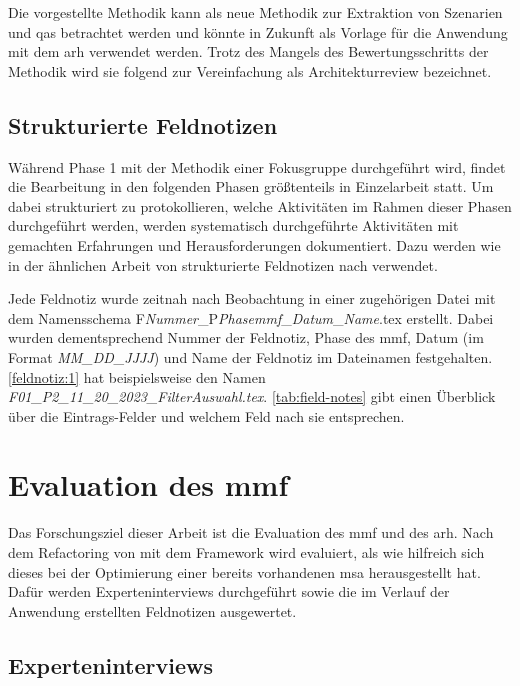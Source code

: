 Die vorgestellte Methodik kann als neue Methodik zur Extraktion von Szenarien und \glspl{qa} betrachtet werden und könnte in Zukunft als Vorlage für die Anwendung mit dem \gls{arh} verwendet werden.
Trotz des Mangels des Bewertungsschritts der Methodik wird sie folgend zur Vereinfachung als Architekturreview bezeichnet.

\subsection{Strukturierte Feldnotizen}
\label{sec:structured-field-notes}
Während Phase 1 mit der Methodik einer Fokusgruppe durchgeführt wird, findet die Bearbeitung in den folgenden Phasen größtenteils in Einzelarbeit statt.
Um dabei strukturiert zu protokollieren, welche Aktivitäten im Rahmen dieser Phasen durchgeführt werden, werden systematisch durchgeführte Aktivitäten mit gemachten Erfahrungen und Herausforderungen dokumentiert. %
Dazu werden wie in der ähnlichen Arbeit von  strukturierte Feldnotizen nach  verwendet.

Jede Feldnotiz wurde zeitnah nach Beobachtung in einer zugehörigen Datei mit dem Namensschema F\emph{Nummer}\_P\emph{Phase\gls{mmf}}\_\emph{Datum}\_\emph{Name}.tex erstellt.
Dabei wurden dementsprechend Nummer der Feldnotiz, Phase des \gls{mmf}, Datum (im Format \emph{MM\_DD\_JJJJ}) und Name der Feldnotiz im Dateinamen festgehalten.
\cref{feldnotiz:1} hat beispielsweise den Namen \emph{F01\_P2\_11\_20\_2023\_FilterAuswahl.tex}.
\cref{tab:field-notes} gibt einen Überblick über die Eintrags-Felder und welchem Feld nach  sie entsprechen.



\section{Evaluation des \gls{mmf}}

Das Forschungsziel dieser Arbeit ist die Evaluation des \gls{mmf} und des \gls{arh}.
Nach dem Refactoring von \jf mit dem Framework wird evaluiert, als wie hilfreich sich dieses bei der Optimierung einer bereits vorhandenen \gls{msa} herausgestellt hat.
Dafür werden Experteninterviews durchgeführt sowie die im Verlauf der Anwendung erstellten Feldnotizen ausgewertet.

\subsection{Experteninterviews}

